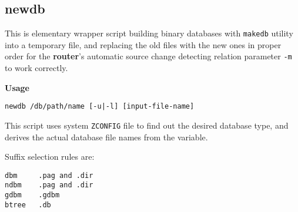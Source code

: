 \subsection{newdb}


This is elementary wrapper script building binary databases
with {\tt makedb} utility into a temporary file, and replacing
the old files with the new ones in proper order for the 
{\bf router}'s automatic source change detecting relation 
parameter {\tt -m} to work correctly.

{\bf Usage}

\begin{verbatim}
newdb /db/path/name [-u|-l] [input-file-name]
\end{verbatim}

This script uses system {\tt ZCONFIG} file to find out the desired
database type, and derives the actual database file names from the 
variable.

Suffix selection rules are:

\begin{verbatim}
dbm     .pag and .dir
ndbm    .pag and .dir
gdbm    .gdbm
btree   .db   
\end{verbatim}
